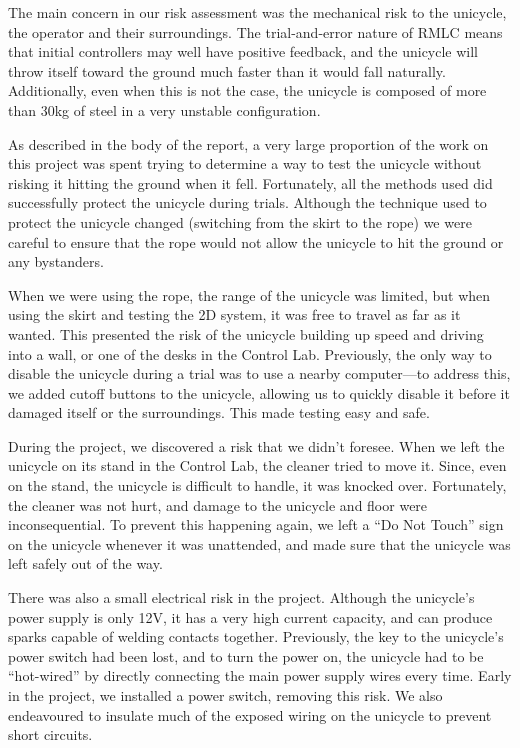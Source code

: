 \documentclass{IIBproject}
\begin{document}
The main concern in our risk assessment was the mechanical risk to the
unicycle, the operator and their surroundings. The trial-and-error nature of
RMLC means that initial controllers may well have positive feedback, and the
unicycle will throw itself toward the ground much faster than it would fall
naturally. Additionally, even when this is not the case, the unicycle is
composed of more than 30kg of steel in a very unstable configuration.

As described in the body of the report, a very large proportion of the work on
this project was spent trying to determine a way to test the unicycle without
risking it hitting the ground when it fell. Fortunately, all the methods used
did successfully protect the unicycle during trials. Although the technique
used to protect the unicycle changed (switching from the skirt to the rope) we
were careful to ensure that the rope would not allow the unicycle to hit the
ground or any bystanders.

When we were using the rope, the range of the unicycle was limited, but when
using the skirt and testing the 2D system, it was free to travel as far as it
wanted. This presented the risk of the unicycle building up speed and driving
into a wall, or one of the desks in the Control Lab. Previously, the only way
to disable the unicycle during a trial was to use a nearby computer---to
address this, we added cutoff buttons to the unicycle, allowing us to quickly
disable it before it damaged itself or the surroundings. This made testing
easy and safe.

During the project, we discovered a risk that we didn't foresee. When we left
the unicycle on its stand in the Control Lab, the cleaner tried to move it.
Since, even on the stand, the unicycle is difficult to handle, it was knocked
over. Fortunately, the cleaner was not hurt, and damage to the unicycle and
floor were inconsequential. To prevent this happening again, we left a ``Do
Not Touch'' sign on the unicycle whenever it was unattended, and made sure
that the unicycle was left safely out of the way.

There was also a small electrical risk in the project. Although the unicycle's
power supply is only 12V, it has a very high current capacity, and can
produce sparks capable of welding contacts together. Previously, the key to
the unicycle's power switch had been lost, and to turn the power on, the
unicycle had to be ``hot-wired'' by directly connecting the main power supply
wires every time. Early in the project, we installed a power switch, removing
this risk. We also endeavoured to insulate much of the exposed wiring on the
unicycle to prevent short circuits.
\end{document}

